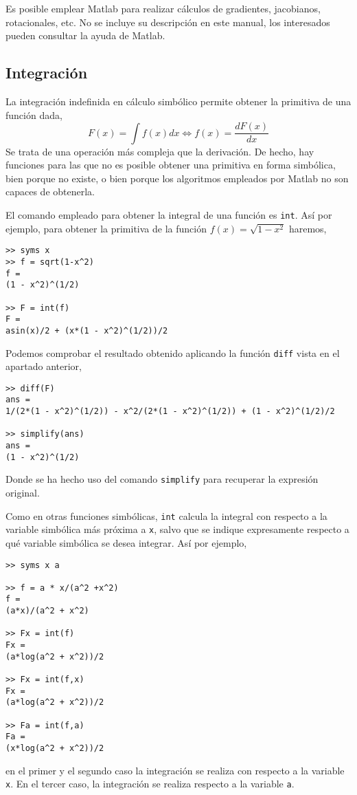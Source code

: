 Es posible emplear Matlab para realizar cálculos de gradientes, jacobianos, rotacionales, etc. No se incluye su descripción en este manual, los interesados pueden consultar la ayuda de Matlab.


\subsection{Integración} 
La integración indefinida en cálculo simbólico permite obtener la primitiva de una función dada,
\begin{equation*}
F(x) = \int f(x)dx  \Leftrightarrow f(x) = \frac{dF(x)}{dx}  
\end{equation*}
Se trata de una operación más compleja que la derivación. De hecho, hay funciones para las que no es posible obtener una primitiva en forma simbólica, bien porque no existe, o bien porque los algoritmos empleados por Matlab no son capaces de obtenerla.

El comando empleado para obtener la integral de una función es \texttt{int}. Así por ejemplo, para obtener la primitiva de la función $f(x) = \sqrt{1-x^2}$ haremos,
\begin{verbatim}
>> syms x
>> f = sqrt(1-x^2) 
f = 
(1 - x^2)^(1/2)
 
>> F = int(f)
F = 
asin(x)/2 + (x*(1 - x^2)^(1/2))/2
\end{verbatim}
Podemos comprobar el resultado obtenido aplicando la función \texttt{diff} vista en el apartado anterior,

\begin{verbatim}
>> diff(F) 
ans = 
1/(2*(1 - x^2)^(1/2)) - x^2/(2*(1 - x^2)^(1/2)) + (1 - x^2)^(1/2)/2
 
>> simplify(ans) 
ans = 
(1 - x^2)^(1/2)
\end{verbatim}
Donde se ha hecho uso del comando \texttt{simplify} para recuperar la expresión original.

Como en otras funciones simbólicas, \texttt{int} calcula la integral con respecto a la variable simbólica más próxima a \texttt{x}, salvo que se indique expresamente respecto a qué variable simbólica se desea integrar. Así por ejemplo,
\begin{verbatim}
>> syms x a

>> f = a * x/(a^2 +x^2) 
f = 
(a*x)/(a^2 + x^2)

>> Fx = int(f) 
Fx =
(a*log(a^2 + x^2))/2 

>> Fx = int(f,x) 
Fx = 
(a*log(a^2 + x^2))/2
 
>> Fa = int(f,a) 
Fa = 
(x*log(a^2 + x^2))/2 
\end{verbatim}
en el primer y el segundo caso la integración se realiza con respecto a la variable \texttt{x}. En el tercer caso, la integración se realiza respecto a la variable \texttt{a}.

